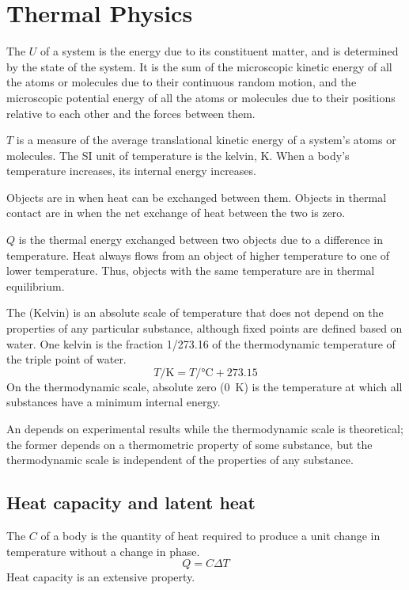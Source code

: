 \documentclass[Physics.tex]{subfiles}
\begin{document}
\chapter{Thermal Physics}
The  \(U\) of a system is the energy due to its constituent matter, and is determined by the state of the system. It is the sum of the microscopic kinetic energy of all the atoms or molecules due to their continuous random motion, and the microscopic potential energy of all the atoms or molecules due to their positions relative to each other and the forces between them.

 \(T\) is a measure of the average translational kinetic energy of a system's atoms or molecules. The SI unit of temperature is the kelvin, \si{\kelvin}. When a body's temperature increases, its internal energy increases.

Objects are in  when heat can be exchanged between them. Objects in thermal contact are in  when the net exchange of heat between the two is zero.

 \(Q\) is the thermal energy exchanged between two objects due to a difference in temperature. Heat always flows from an object of higher temperature to one of lower temperature. Thus, objects with the same temperature are in thermal equilibrium.

The  (Kelvin)  is an absolute scale of temperature that does not depend on the properties of any particular substance, although fixed points are defined based on water. One kelvin is the fraction 1/273.16 of the thermodynamic temperature of the triple point of water. \begin{equation}T/\si{\kelvin} = T/\si{\degreeCelsius} + 273.15\end{equation} On the thermodynamic scale, absolute zero (\SI{0}{\kelvin}) is the temperature at which all substances have a minimum internal energy.

An  depends on experimental results while the thermodynamic scale is theoretical; the former depends on a thermometric property of some substance, but the thermodynamic scale is independent of the properties of any substance.
\section{Heat capacity and latent heat}
The  \(C\) of a body is the quantity of heat required to produce a unit change in temperature without a change in phase. \begin{equation}Q = C\Delta T\end{equation} Heat capacity is an extensive property.
\end{document}
